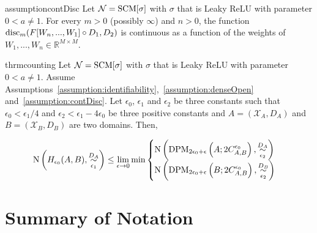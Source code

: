 \documentclass{article} %
\newcommand{\disc}{\textnormal{disc}}
\newcommand{\Cov}{\textnormal{N}}
\begin{document}
\begin{restatable}{assumption}{contDisc}\label{assumption:contDisc} Let $\mathcal{N} = \textnormal{SCM}[\sigma]$ with $\sigma$ that is Leaky ReLU with parameter $0<a\neq 1$. For every $m>0$ (possibly $\infty$) and $n>0$, the function $\disc_m(F[W_{n},...,W_1] \circ D_1,D_2)$ is continuous as a function of the weights of $W_{1},...,W_n \in \mathbb{R}^{M\times M}$. 

\end{restatable}
 

\begin{restatable}{thrm}{counting}\label{thm:counting} Let $\mathcal{N} = \textnormal{SCM}[\sigma]$ with $\sigma$ that is Leaky ReLU with parameter $0< a \neq 1$. Assume Assumptions~\ref{assumption:identifiability},~\ref{assumption:denseOpen} and~\ref{assumption:contDisc}. Let $\epsilon_0$, $\epsilon_1$ and $\epsilon_2$ be three constants such that $\epsilon_0 < \epsilon_1/4$ and $\epsilon_2 < \epsilon_1-4\epsilon_0$ be three positive constants and $A = (\mathcal{X}_A,D_A)$ and $B = (\mathcal{X}_B, D_B)$ are two domains. Then, 
\begin{small}
\begin{equation}
\begin{aligned}
\Cov\left(H_{\epsilon_0}(A,B),\overset{D_A}{\underset{\epsilon_1}{\sim}}\right) \leq 
\lim_{\epsilon \to 0}\min \begin{cases}
\Cov\left (\textnormal{DPM}_{2\epsilon_0+\epsilon}\left(A; 2C^{\epsilon_0}_{A,B} \right), \overset{D_A}{\underset{\epsilon_2}{\sim}} \right)\\
\Cov\left (\textnormal{DPM}_{2\epsilon_0+\epsilon}\left(B; 2C^{\epsilon_0}_{A,B} \right), \overset{D_B}{\underset{\epsilon_2}{\sim}} \right)
\end{cases}
\end{aligned}
\end{equation}
\end{small}
\end{restatable}


 

\newpage

 

\section{Summary of Notation}

\label{sec:summary}
\end{document}
